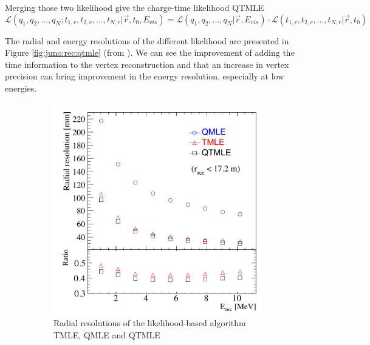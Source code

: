 \documentclass[../main.tex]{subfiles}
\begin{document}
Merging those two likelihood give the charge-time likelihood QTMLE
\begin{equation}
  \mathcal{L}(q_1, q_2, ..., q_N; t_{1,r}, t_{2,r}, ..., t_{N,r} | \vec{r}, t_0 , E_{vis}) = \mathcal{L}(q_1, q_2, ..., q_N | \vec{r}, E_{vis}) \cdot \mathcal{L}(t_{1,r}, t_{2,r}, ..., t_{N,r} | \vec{r}, t_0)
\end{equation}

The radial and energy resolutions of the different likelihood are presented in Figure \ref{fig:juno:rec:qtmle} (from \cite{huang_data-driven_2023}). We can see the improvement of adding the time information to the vertex reconstruction and that an increase in vertex precision can bring improvement in the energy resolution, especially at low energies.

\begin{figure}[ht]
  \begin{subfigure}{0.48\linewidth}
    \centering
    \includegraphics[width=\textwidth]{images/juno/reco/radial_qtmle.png}
    \caption{Radial resolutions of the likelihood-based algorithm TMLE, QMLE and QTMLE}
  \end{subfigure}
  \hfill
  \begin{subfigure}{0.48\linewidth}
    \centering

\end{subfigure}
\end{figure}
\end{document}
